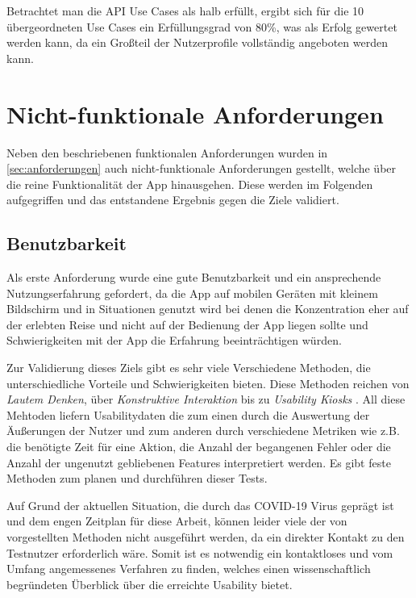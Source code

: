 \vspace{0.25cm}

Betrachtet man die API Use Cases als halb erfüllt, ergibt sich für die 10 übergeordneten Use Cases ein Erfüllungsgrad von 80\%, was als Erfolg gewertet werden kann, da ein Großteil der Nutzerprofile vollständig angeboten werden kann.

\section{Nicht-funktionale Anforderungen}
Neben den beschriebenen funktionalen Anforderungen wurden in \autoref{sec:anforderungen} auch nicht-funktionale Anforderungen gestellt, welche über die reine Funktionalität der App hinausgehen. Diese werden im Folgenden aufgegriffen und das entstandene Ergebnis gegen die Ziele validiert.

	\subsection{Benutzbarkeit}
	Als erste Anforderung wurde eine gute Benutzbarkeit und ein ansprechende Nutzungserfahrung gefordert, da die App auf mobilen Geräten mit kleinem Bildschirm und in Situationen genutzt wird bei denen die Konzentration eher auf der erlebten Reise und nicht auf der Bedienung der App liegen sollte und Schwierigkeiten mit der App die Erfahrung beeinträchtigen würden.
	
	\vspace{0.25cm}
	
	Zur Validierung dieses Ziels gibt es sehr viele Verschiedene Methoden, die unterschiedliche Vorteile und Schwierigkeiten bieten. Diese Methoden reichen von \textit{Lautem Denken}, über \textit{Konstruktive Interaktion} bis zu \textit{Usability Kiosks} \cite{Nielsen.20091993}. All diese Mehtoden liefern Usabilitydaten die zum einen durch die Auswertung der Äußerungen der Nutzer und zum anderen durch verschiedene Metriken wie z.B. die benötigte Zeit für eine Aktion, die Anzahl der begangenen Fehler oder die Anzahl der ungenutzt gebliebenen Features interpretiert werden. Es gibt feste Methoden zum planen und durchführen dieser Tests.
	
	\vspace{0.25cm}
	
	Auf Grund der aktuellen Situation, die durch das COVID-19 Virus geprägt ist und dem engen Zeitplan für diese Arbeit, können leider viele der von \cite{Nielsen.20091993} vorgestellten Methoden nicht ausgeführt werden, da ein direkter Kontakt zu den Testnutzer erforderlich wäre. Somit ist es notwendig ein kontaktloses und vom Umfang angemessenes Verfahren zu finden, welches einen wissenschaftlich begründeten Überblick über die erreichte Usability bietet.
	
